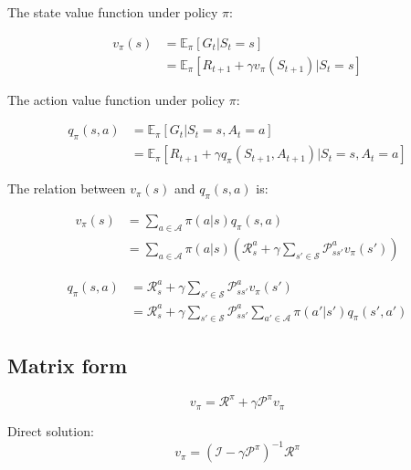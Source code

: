 \documentclass{article}
\begin{document}
The state value function under policy $\pi$:

\begin{equation}
\begin{aligned}
    v_{\pi}(s) &= \mathbb{E}_{\pi}[G_t | S_t = s]\\
    &= \mathbb{E}_{\pi}[R_{t+1} + \gamma v_{\pi}(S_{t+1}) | S_t = s]
\end{aligned}
\end{equation}

The action value function under policy $\pi$:

\begin{equation}
\begin{aligned}
    q_{\pi}(s, a) &= \mathbb{E}_{\pi}[G_t | S_t = s, A_t = a]\\
    &= \mathbb{E}_{\pi}[R_{t+1} + \gamma q_{\pi}(S_{t+1}, A_{t+1}) | S_t = s, A_t = a]
\end{aligned}
\end{equation}

The relation between $v_{\pi}(s)$ and $q_{\pi}(s, a)$ is:

\begin{equation}
\begin{aligned}
    v_{\pi}(s) &= \sum_{a\in\mathcal{A}} \pi(a|s) q_{\pi}(s, a)\\
    &= \sum_{a\in\mathcal{A}} \pi(a|s) (\mathcal{R}^a_s + \gamma \sum_{s'\in\mathcal{S}} \mathcal{P}^a_{ss'}v_{\pi}(s'))
\end{aligned}
\end{equation}

\begin{equation}
\begin{aligned}
    q_{\pi}(s, a) &= \mathcal{R}_s^a + \gamma \sum_{s'\in\mathcal{S}}\mathcal{P}^a_{ss'}v_{\pi}(s')\\
    &= \mathcal{R}_s^a + \gamma \sum_{s'\in\mathcal{S}}\mathcal{P}^a_{ss'}\sum_{a'\in\mathcal{A}} \pi(a'|s') q_{\pi}(s', a')
\end{aligned}
\end{equation}

\subsection{Matrix form}
\begin{equation}
    v_{\pi} = \mathcal{R}^{\pi} + \gamma \mathcal{P}^{\pi}v_{\pi}
\end{equation}

Direct solution:
\begin{equation}
    v_{\pi} = (\mathcal{I} - \gamma \mathcal{P}^{\pi})^{-1} \mathcal{R}^{\pi}
\end{equation}
\end{document}

